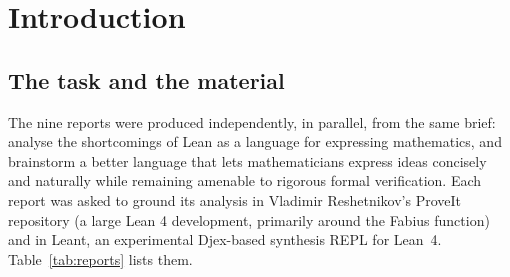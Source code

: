 \documentclass[11pt,a4paper]{article}
\theoremstyle{definition}
\begin{document}
\begingroup
\small
\tableofcontents
\endgroup
\clearpage

\section{Introduction}
\label{sec:intro}

\subsection{The task and the material}
The nine reports were produced independently, in parallel, from the same brief: analyse the shortcomings of Lean as a language for expressing mathematics, and brainstorm a better language that lets mathematicians express ideas concisely and naturally while remaining amenable to rigorous formal verification. Each report was asked to ground its analysis in Vladimir Reshetnikov's ProveIt repository (a large Lean 4 development, primarily around the Fabius function) and in Leant, an experimental Djex-based synthesis REPL for Lean~4. Table~\ref{tab:reports} lists them.
\end{document}
